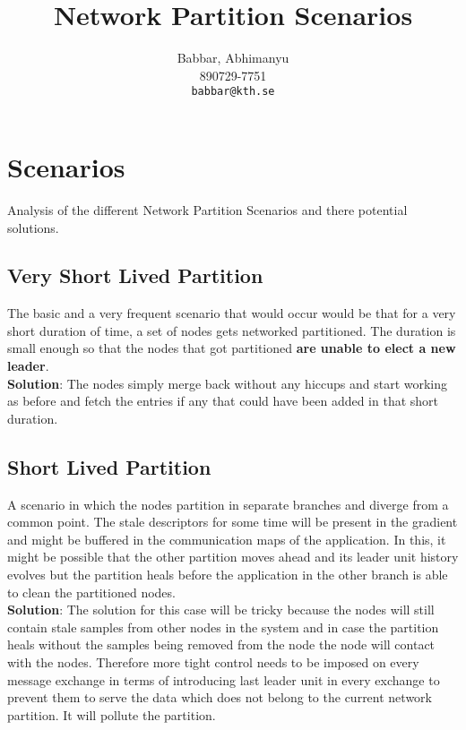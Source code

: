 \documentclass[a4paper, 11pt]{article}
\author{
  Babbar, Abhimanyu\\
  \textsc{890729-7751}\\
  \texttt{babbar@kth.se}
}
\title{Network Partition Scenarios}
\begin{document}
\maketitle 

\section{Scenarios}
Analysis of the different Network Partition Scenarios and there potential solutions.

\subsection{Very Short Lived Partition}
The basic and a very frequent scenario that would occur would be that for a very short duration of time, a set of nodes gets networked partitioned. The duration is small enough so that the nodes that got partitioned \textbf{are unable to elect a new leader}.\\

\textbf{Solution}: The nodes simply merge back without any hiccups and start working as before and fetch the entries if any that could have been added in that short duration.


\subsection{Short Lived Partition}
A scenario in which the nodes partition in separate branches and diverge from a common point. The stale descriptors for some time will be present in the gradient and might be buffered in the communication maps of the application. In this, it might be possible that the other partition moves ahead and its leader unit history evolves but the partition heals before the application in the other branch is able to clean the partitioned nodes. \\

\textbf{Solution}: The solution for this case will be tricky because the nodes will still contain stale samples from other nodes in the system and in case the partition heals without the samples being removed from the node the node will contact with the nodes. Therefore more tight control needs to be imposed on every message exchange in terms of introducing last leader unit in every exchange to prevent them to serve the data which does not belong to the current network partition. It will pollute the partition.
\end{document}
